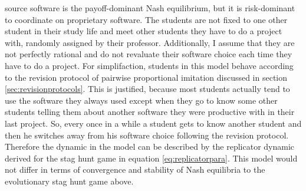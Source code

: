 \documentclass[11pt]{article}
\begin{document}
source software is the payoff-dominant Nash equilibrium, but it is 
risk-dominant to coordinate on proprietary software. 
The students are not fixed to one other student in their study life and
meet other students they have to do a project with, randomly assigned by their
professor. Additionally, I assume that they are not perfectly rational and
do not revaluate their software choice each time they have to do a project. 
For simplifaction, students
in this model behave according to the revision protocol of pairwise
proportional imitation discussed in section \ref{sec:revisionprotocols}. This
is justified, because most students actually tend to use the software they
always used except when they go to know some other students telling them about
another software they were productive with in their last project. So, 
every once in a while a student gets to know another student and then he switches
away from his software choice following the revision protocol. 
Therefore the dynamic in the model can be described by the replicator dynamic
derived for the stag hunt game in equation \eqref{eq:replicatorpara}.
This model would not differ in terms of convergence and stability of Nash 
equilibria to the evolutionary stag hunt game above.
\end{document}

